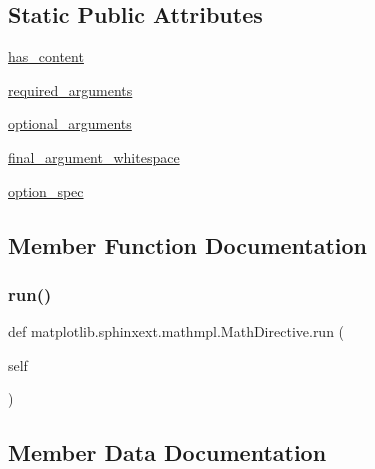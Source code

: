 \subsection*{Static Public Attributes}
\begin{DoxyCompactItemize}
\item 
\hyperlink{classmatplotlib_1_1sphinxext_1_1mathmpl_1_1MathDirective_ad9ba12057309499e5a7e143f19776ccf}{has\+\_\+content}
\item 
\hyperlink{classmatplotlib_1_1sphinxext_1_1mathmpl_1_1MathDirective_a6542d939e0b01a993c0dadb03e8fa38a}{required\+\_\+arguments}
\item 
\hyperlink{classmatplotlib_1_1sphinxext_1_1mathmpl_1_1MathDirective_a6bb37c5dec2265da1928b8f2f0ddee97}{optional\+\_\+arguments}
\item 
\hyperlink{classmatplotlib_1_1sphinxext_1_1mathmpl_1_1MathDirective_a3d1565b2c2f0207ae0cb6b571a743ca6}{final\+\_\+argument\+\_\+whitespace}
\item 
\hyperlink{classmatplotlib_1_1sphinxext_1_1mathmpl_1_1MathDirective_ad707ac83411634355be7927f753bec8c}{option\+\_\+spec}
\end{DoxyCompactItemize}


\subsection{Member Function Documentation}
\mbox{\label{classmatplotlib_1_1sphinxext_1_1mathmpl_1_1MathDirective_aa48fd39c0556c1bbe0ecaccba2c06ad4}} 
\subsubsection{\texorpdfstring{run()}{run()}}
{\footnotesize\ttfamily def matplotlib.\+sphinxext.\+mathmpl.\+Math\+Directive.\+run (\begin{DoxyParamCaption}\item[{}]{self }\end{DoxyParamCaption})}



\subsection{Member Data Documentation}
\mbox{\label{classmatplotlib_1_1sphinxext_1_1mathmpl_1_1MathDirective_a3d1565b2c2f0207ae0cb6b571a743ca6}} 
